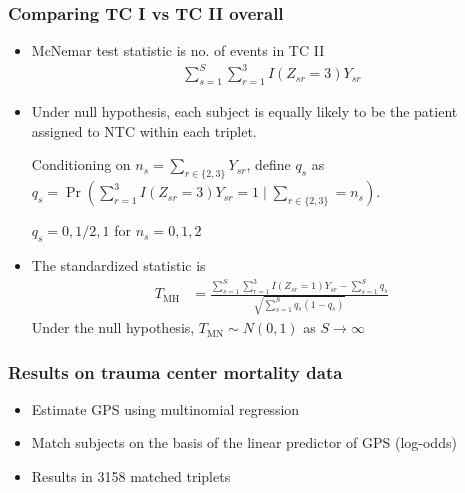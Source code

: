 
\begin{frame}
  \frametitle{Comparing TC I vs TC II overall}
  
  \begin{itemize}
  \item McNemar test statistic is no. of events in TC II
    \begin{align*}
      \sum_{s=1}^{S} \sum_{r=1}^{3} I(Z_{sr} = 3) Y_{sr}
    \end{align*} 
  \item Under null hypothesis, each subject is equally likely to be
    the patient assigned to NTC within each triplet.

    Conditioning on $n_s = \sum_{r\in\{2,3\}}^{} Y_{sr}$, define $q_s$ as
    $q_s = \Pr(\sum_{r=1}^{3}I(Z_{sr} = 3)Y_{sr} = 1 \mid \sum_{r\in\{2,3\}}^{}
    = n_s) $.

    $q_s = 0, 1/2, 1$ for $n_s = 0,1,2$
  \item The standardized statistic is
    \begin{align*}
      T_{\text{MH}} &= \frac{\sum_{s=1}^{S} \sum_{r=1}^{3} I(Z_{sr} = 1)
               Y_{sr} - \sum_{s=1}^{S} q_s}{\sqrt{\sum_{s=1}^{S}q_s(1-q_s)}}
    \end{align*}
    Under the null hypothesis, $T_{\text{MN}} \sim N(0, 1)$ as
    $S\rightarrow \infty$
  \end{itemize}
  
\end{frame}


\begin{frame}
  \frametitle{Results on trauma center mortality data}
  
  \begin{itemize}
  \item Estimate GPS using multinomial regression \medskip 
  \item Match subjects on the basis of the linear predictor of GPS
    (log-odds) \medskip 
  \item Results in 3158 matched triplets
  \end{itemize}
  
\end{frame}


